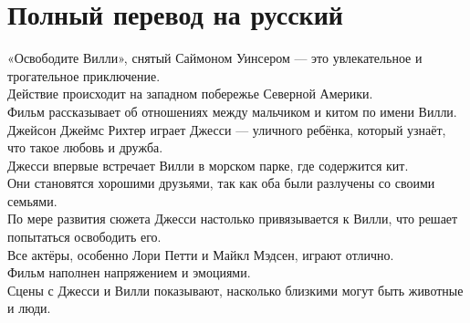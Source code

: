 \documentclass[12pt]{article}
\begin{document}
\section*{Полный перевод на русский}

«Освободите Вилли», снятый Саймоном Уинсером — это увлекательное и трогательное приключение.\\
Действие происходит на западном побережье Северной Америки.\\
Фильм рассказывает об отношениях между мальчиком и китом по имени Вилли.\\
Джейсон Джеймс Рихтер играет Джесси — уличного ребёнка, который узнаёт, что такое любовь и дружба.\\
Джесси впервые встречает Вилли в морском парке, где содержится кит.\\
Они становятся хорошими друзьями, так как оба были разлучены со своими семьями.\\
По мере развития сюжета Джесси настолько привязывается к Вилли, что решает попытаться освободить его.\\
Все актёры, особенно Лори Петти и Майкл Мэдсен, играют отлично.\\
Фильм наполнен напряжением и эмоциями.\\
Сцены с Джесси и Вилли показывают, насколько близкими могут быть животные и люди.
\end{document}
